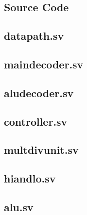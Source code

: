 \documentclass[titlepage,12pt,oneside,a4paper]{article}
\begin{document}
\newpage
\appendix
\begin{multicols}{2}

\section{Source Code}
\label{appendix:src}
\subsection{datapath.sv}


\subsection{maindecoder.sv}


\subsection{aludecoder.sv}


\subsection{controller.sv}


\subsection{multdivunit.sv}
\label{appendix:multdivunit}


\subsection{hiandlo.sv}


\subsection{alu.sv}



\end{multicols}
\end{document}
